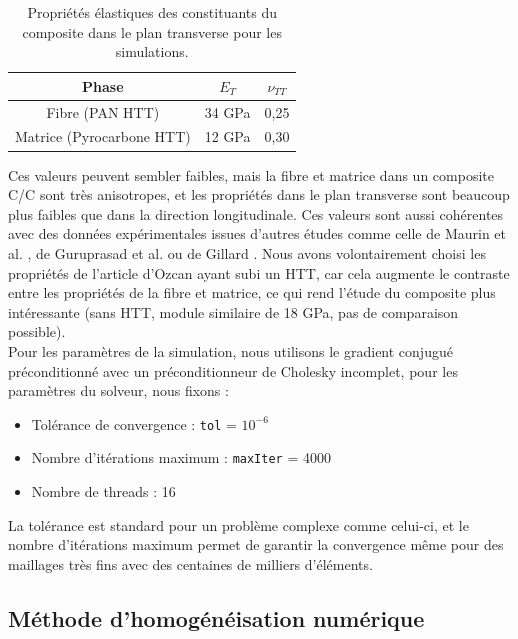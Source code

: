 \documentclass[a4paper,11pt]{article}
\begin{document}
\begin{table}[H]
\centering
\small
\renewcommand{\arraystretch}{1.2}
\begin{tabular}{|c|c|c|}
\hline
\textbf{Phase} & \textbf{$E_T$} & \textbf{$\nu_{TT}$} \\
\hline
Fibre (PAN HTT) & 34 GPa & 0,25 \\
Matrice (Pyrocarbone HTT) & 12 GPa & 0,30 \\
\hline
\end{tabular}
\caption{Propriétés élastiques des constituants du composite dans le plan transverse pour les simulations.}
\label{tab:properties_composite}
\end{table}

\vspace{0.1cm}
Ces valeurs peuvent sembler faibles, mais la fibre et matrice dans un composite C/C sont très anisotropes, et les propriétés dans le plan transverse sont beaucoup plus faibles que dans la direction longitudinale. Ces valeurs sont aussi cohérentes avec des données expérimentales issues d'autres études comme celle de Maurin et al. \cite{MaurinTransverseCC}, de Guruprasad et al. \cite{GuruprasadNanoindent} ou de Gillard \cite{GillardThesis2017}. Nous avons volontairement choisi les propriétés de l'article d'Ozcan \cite{OzcanCC} ayant subi un HTT, car cela augmente le contraste entre les propriétés de la fibre et matrice, ce qui rend l'étude du composite plus intéressante (sans HTT, module similaire de 18 GPa, pas de comparaison possible). \\

Pour les paramètres de la simulation, nous utilisons le gradient conjugué préconditionné avec un préconditionneur de Cholesky incomplet, pour les paramètres du solveur, nous fixons :
\begin{itemize}
    \item Tolérance de convergence : \texttt{tol} = $10^{-6}$
    \item Nombre d'itérations maximum : \texttt{maxIter} = 4000
    \item Nombre de threads : 16
\end{itemize}

\vspace{0.1cm}
La tolérance est standard pour un problème complexe comme celui-ci, et le nombre d'itérations maximum permet de garantir la convergence même pour des maillages très fins avec des centaines de milliers d'éléments.

\subsection{Méthode d'homogénéisation numérique}
\end{document}
